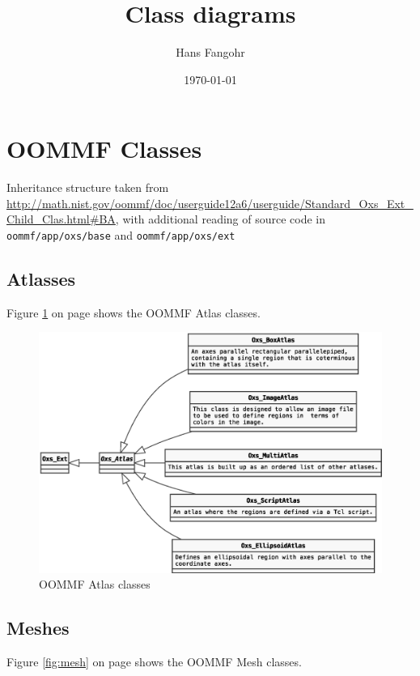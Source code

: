 \documentclass[a4paper,12pt]{article}
\author{Hans Fangohr}
\date{\today}
\title{Class diagrams}
\begin{document}
\maketitle
\tableofcontents



\section{OOMMF Classes}
\label{sec-1}


Inheritance structure taken from \url{http://math.nist.gov/oommf/doc/userguide12a6/userguide/Standard_Oxs_Ext_Child_Clas.html#BA}, with additional reading of source code in \verb~oommf/app/oxs/base~ and \verb~oommf/app/oxs/ext~

\subsection{Atlasses}
\label{sec-1-1}

Figure \ref{fig:atlas} on page \pageref{fig:atlas} shows the OOMMF Atlas classes.

\begin{figure}[htb]
\centering
\includegraphics[width=1\textwidth]{atlas.eps}
\caption{\label{fig:atlas}OOMMF Atlas classes}
\end{figure}

\subsection{Meshes}
\label{sec-1-2}

Figure \ref{fig:mesh} on page \pageref{fig:mesh} shows the OOMMF Mesh classes.
\end{document}
